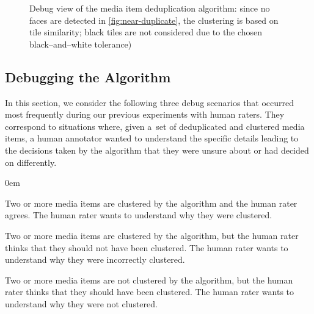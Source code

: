 \documentclass{article}
\begin{document}
\begin{figure}[t!]
  \centering
  \caption{Debug view of the media item deduplication algorithm: since no faces are detected in \autoref{fig:near-duplicate}, the clustering is based on tile similarity; black tiles are not considered due to the chosen black--and--white tolerance)}
  \label{fig:algorithmdebug}
\end{figure}

\subsection{Debugging the Algorithm}
\label{sec:debugging-the-algorithm}
In this section, we consider the following three debug scenarios that occurred most frequently during our previous experiments with human raters. They correspond to situations where, given a~set of deduplicated and clustered media items, a human annotator wanted to understand the specific details leading to the decisions taken by the algorithm that they were unsure about or had decided on differently.
\begin{description}
  \itemsep0em
  \item[Clustering Consent.] Two or more media items are clustered by the algorithm and the human rater agrees. The human rater wants to understand why they were clustered.
  \item[Clustering Dissent.] Two or more media items are clustered by the algorithm, but the human rater thinks that they should not have been clustered. The human rater wants to understand why they were incorrectly clustered.
  \item[Non-Clustering Dissent.] Two or more media items are not clustered by the algorithm, but the human rater thinks that they should have been clustered. The human rater wants to understand why they were not clustered.
\end{description}
\end{document}
